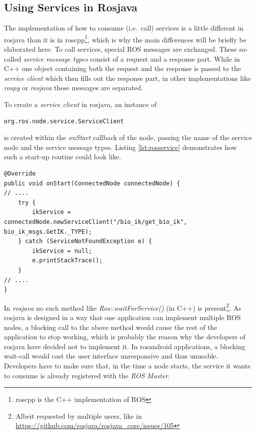 \subsection{Using Services in Rosjava}
\label{sec:using_services}
The implementation of how to consume (i.e.~call) services is a little different in rosjava than it is in roscpp\footnote{roscpp is the C++ implementation of ROS}, which is why the main differences will be briefly be elaborated here. To call services, special ROS messages are exchanged. These so-called \textit{service message types} consist of a request and a response part. While in C++ one object containing both the request and the response is passed to the \textit{service client} which then fills out the response part\cite{ros:serviceclient}, in other implementations like \textit{rospy} or \textit{rosjava} these messages are separated.

To create a \textit{service client} in rosjava, an instance of 

\begin{lstlisting}[numbers=none]
org.ros.node.service.ServiceClient
\end{lstlisting}

is created within the \textit{onStart} callback of the node, passing the name of the service node and the service message types. Listing \ref{lst:rosservice} demonstrates how such a start-up routine could look like.

\begin{lstlisting}[caption={Example on how to connect to a ROS service in rosjava},label=lst:rosservice]
@Override
public void onStart(ConnectedNode connectedNode) {
// ....
	try {
		ikService = connectedNode.newServiceClient("/bio_ik/get_bio_ik", bio_ik_msgs.GetIK._TYPE);
	} catch (ServiceNotFoundException e) {
		ikService = null;
		e.printStackTrace();
	}	
// ....
}
\end{lstlisting}

In \textit{rosjava} no such method like \textit{Ros::waitForService()} (in C++) is present\footnote{Albeit requested by multiple users, like in \url{https://github.com/rosjava/rosjava_core/issues/105}}. As rosjava is designed in a way that one application can implement multiple ROS nodes, a blocking call to the above method would cause the rest of the application to stop working, which is probably the reason why the developers of rosjava have decided not to implement it. In rosandroid applications, a blocking wait-call would cast the user interface unresponsive and thus unusable. Developers have to make sure that, in the time a node starts, the service it wants to consume is already registered with the \textit{ROS Master}.


